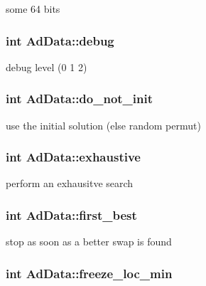 some 64 bits \hypertarget{classAdData_afeb196198499026a227948b01f5d6676}{
\subsubsection[{debug}]{\setlength{\rightskip}{0pt plus 5cm}int {\bf \-Ad\-Data\-::debug}}}\label{classAdData_afeb196198499026a227948b01f5d6676}
debug level (0 1 2) \hypertarget{classAdData_a988620949ce258a678030e920ef1d924}{
\subsubsection[{do\-\_\-not\-\_\-init}]{\setlength{\rightskip}{0pt plus 5cm}int {\bf \-Ad\-Data\-::do\-\_\-not\-\_\-init}}}\label{classAdData_a988620949ce258a678030e920ef1d924}
use the initial solution (else random permut) \hypertarget{classAdData_aaa20f10e31a32e68a8ba89ba6cb45418}{
\subsubsection[{exhaustive}]{\setlength{\rightskip}{0pt plus 5cm}int {\bf \-Ad\-Data\-::exhaustive}}}\label{classAdData_aaa20f10e31a32e68a8ba89ba6cb45418}
perform an exhausitve search \hypertarget{classAdData_a90287e9e24c3283b02afa11547fd09a8}{
\subsubsection[{first\-\_\-best}]{\setlength{\rightskip}{0pt plus 5cm}int {\bf \-Ad\-Data\-::first\-\_\-best}}}\label{classAdData_a90287e9e24c3283b02afa11547fd09a8}
stop as soon as a better swap is found \hypertarget{classAdData_a56f6a4d4c38156e5583502dec2b84d98}{
\subsubsection[{freeze\-\_\-loc\-\_\-min}]{\setlength{\rightskip}{0pt plus 5cm}int {\bf \-Ad\-Data\-::freeze\-\_\-loc\-\_\-min}}}\label{classAdData_a56f6a4d4c38156e5583502dec2b84d98}
